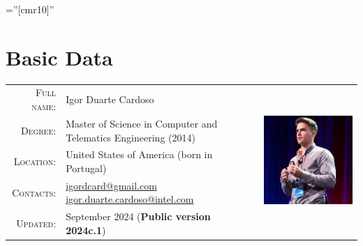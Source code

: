\documentclass[letter,10pt]{article} %
\begin{document}
\hypersetup{colorlinks,breaklinks,urlcolor=linkcolour,linkcolor=linkcolour} %

\pagestyle{empty} %

\font\fb=''[cmr10]'' %



\par{\bigskip\par} %

\section{Basic Data}

\begin{tabular}{rlr}
\textsc{Full name:} & Igor Duarte Cardoso & \multirow{7}{*}{\includegraphics[scale=0.35]{avatar.jpg}} \\
\textsc{Degree:} & Master of Science in Computer and Telematics Engineering (2014) & \\
\textsc{Location:} & United States of America (born in Portugal) & \\
\textsc{Contacts:} & \href{mailto:igordcard+cv@gmail.com}{igordcard@gmail.com}  \href{mailto:igor.duarte.cardoso@intel.com}{igor.duarte.cardoso@intel.com} & \\
\textsc{Updated:} & September 2024 (\textbf{Public version 2024c.1}) & \\
\end{tabular} \\
\end{document}
